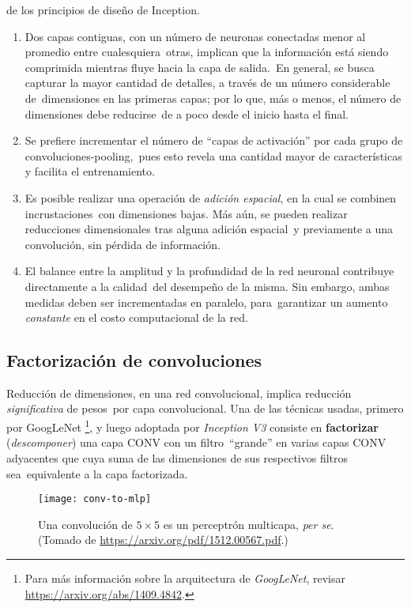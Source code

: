 de los principios de diseño de Inception.
\begin{enumerate}[label=\textbf{P.\arabic*}]
\item Dos capas contiguas, con un número de neuronas conectadas menor al promedio entre cualesquiera\
  otras, implican que la información está siendo comprimida mientras fluye hacia la capa de salida.\
  En general, se busca capturar la mayor cantidad de detalles, a través de un número considerable de\
  dimensiones en las primeras capas; por lo que, más o menos, el número de dimensiones debe reducirse\
  de a poco desde el inicio hasta el final.
\item Se prefiere incrementar el número de ``capas de activación'' por cada grupo de convoluciones-pooling,\
  pues esto revela una cantidad mayor de características y facilita el entrenamiento.
\item \label{sp-agg} Es posible realizar una operación de \emph{adición espacial}, en la cual se combinen incrustaciones\
  con dimensiones bajas. Más aún, se pueden realizar reducciones dimensionales tras alguna adición espacial\
  y previamente a una convolución, sin pérdida de información.
\item El balance entre la amplitud y la profundidad de la red neuronal contribuye directamente a la calidad\
  del desempeño de la misma. Sin embargo, ambas medidas deben ser incrementadas en paralelo, para\
  garantizar un aumento \emph{constante} en el costo computacional de la red.
\end{enumerate}

\subsection{Factorización de convoluciones}

Reducción de dimensiones, en una red convolucional, implica reducción \emph{significativa} de pesos\
por capa convolucional. Una de las técnicas usadas, primero por GoogLeNet
\footnote{
  Para más información sobre la arquitectura de \emph{GoogLeNet}, revisar \url{https://arxiv.org/abs/1409.4842}.
},
y luego adoptada por \emph{Inception V3} consiste en \textbf{factorizar} (\emph{descomponer}) una capa CONV con un filtro\
``grande'' en varias capas CONV adyacentes que cuya suma de las dimensiones de sus respectivos filtros sea\
equivalente a la capa factorizada.\par

\begin{figure}[H]
  \centering
  \texttt{[image: conv-to-mlp]}
  \caption{Una convolución de $5 \times 5$ es un perceptrón multicapa, \emph{per se}.
    (Tomado de \url{https://arxiv.org/pdf/1512.00567.pdf}.)}
  \label{conv-to-mlp}
\end{figure}

